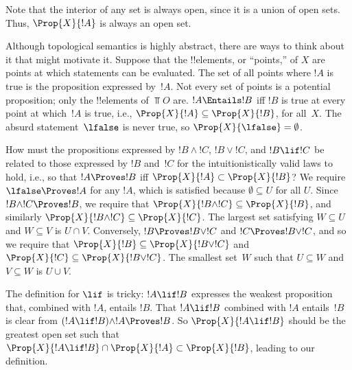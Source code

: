 \documentclass[../../../include/open-logic-section]{subfiles}
\begin{document}
Note that the interior of any set is always open, since it is a union
of open sets. Thus, $\Prop{X}{!A}$ is always an open set.

Although topological semantics is highly abstract, there are ways to
think about it that might motivate it. Suppose that the !!{element}s,
or ``points,'' of $X$ are points at which statements can be
evaluated. The set of all points where $!A$ is true is the proposition
expressed by~$!A$. Not every set of points is a potential proposition;
only the !!{element}s of $\Top{O}$ are.  $!A \Entails !B$ iff $!B$ is
true at every point at which~$!A$ is true, i.e., $\Prop{X}{!A}
\subseteq \Prop{X}{!B}$, for all~$X$. The absurd statement~$\lfalse$
is never true, so $\Prop{X}{\lfalse} = \emptyset$.

How must the propositions expressed by $!B \land !C$, $!B \lor !C$,
and $!B \lif !C$ be related to those expressed by $!B$ and~$!C$ for
the intuitionistically valid laws to hold, i.e., so that $!A \Proves
!B$ iff $\Prop{X}{!A} \subset \Prop{X}{!B}$? We require $\lfalse
\Proves !A$ for any $!A$, which is satisfied because $\emptyset
\subseteq U$ for all $U$.  Since $!B \land !C \Proves !B$, we require
that $\Prop{X}{!B \land !C} \subseteq \Prop{X}{!B}$, and similarly
$\Prop{X}{!B \land !C} \subseteq \Prop{X}{!C}$. The largest set
satisfying $W \subseteq U$ and $W \subseteq V$ is $U \cap V$.
Conversely, $!B \Proves !B \lor !C$ and $!C \Proves !B \lor !C$, and
so we require that $\Prop{X}{!B} \subseteq \Prop{X}{!B \lor !C}$ and
$\Prop{X}{!C} \subseteq \Prop{X}{!B \lor !C}$. The smallest set~$W$
such that $U \subseteq W$ and $V \subseteq W$ is $U \cup V$.

The definition for $\lif$ is tricky: $!A \lif !B$ expresses the
weakest proposition that, combined with $!A$, entails $!B$. That $!A
\lif !B$ combined with $!A$ entails~$!B$ is clear from $(!A \lif !B)
\land !A \Proves !B $. So $\Prop{X}{!A \lif !B}$ should be the
greatest open set such that $\Prop{X}{!A \lif !B} \cap \Prop{X}{!A}
\subset \Prop{X}{!B}$, leading to our definition.
\end{document}
